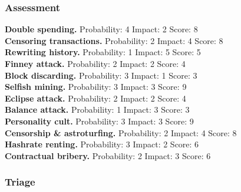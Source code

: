 \documentclass[11pt,a4paper]{article}
\begin{document}
\subsubsection{Assessment}

\textbf{Double spending.}
Probability: 4
Impact: 2
Score: 8\\

\textbf{Censoring transactions.}
Probability: 2
Impact: 4
Score: 8\\

\textbf{Rewriting history.}
Probability: 1
Impact: 5
Score: 5\\

\textbf{Finney attack.}
Probability: 2
Impact: 2
Score: 4\\

\textbf{Block discarding.}
Probability: 3
Impact: 1
Score: 3\\

\textbf{Selfish mining.}
Probability: 3
Impact: 3
Score: 9\\

\textbf{Eclipse attack.}
Probability: 2
Impact: 2
Score: 4\\

\textbf{Balance attack.}
Probability: 1
Impact: 3
Score: 3\\

\textbf{Personality cult.}
Probability: 3
Impact: 3
Score: 9\\

\textbf{Censorship \& astroturfing.}
Probability: 2
Impact: 4
Score: 8\\

\textbf{Hashrate renting.}
Probability: 3
Impact: 2
Score: 6\\

\textbf{Contractual bribery.}
Probability: 2
Impact: 3
Score: 6\\

\subsubsection{Triage}
\end{document}
